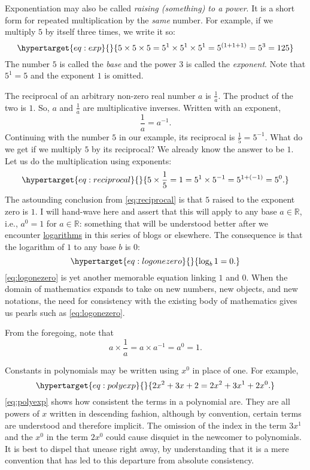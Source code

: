 \documentclass[
  a4paper,
]{article}
\begin{document}
Exponentiation may also be called \emph{raising (something) to a power}.
It is a short form for repeated multiplication by the \emph{same}
number. For example, if we multiply \(5\) by itself three times, we
write it so: \begin{equation}\protect\hypertarget{eq:exp}{}{
5\times5\times5 = 5^1\times5^1\times5^1 = 5^{(1+1+1)} = 5^{3} = 125
}\label{eq:exp}\end{equation} The number \(5\) is called the \emph{base}
and the power \(3\) is called the \emph{exponent}. Note that \(5^1 = 5\)
and the exponent \(1\) is omitted.

The reciprocal of an arbitrary non-zero real number \(a\) is
\(\frac{1}{a}\). The product of the two is \(1\). So, \(a\) and
\(\frac{1}{a}\) are multiplicative inverses. Written with an exponent,
\[
\frac{1}{a} = a^{-1}.
\] Continuing with the number \(5\) in our example, its reciprocal is
\(\frac{1}{5} = 5^{-1}\). What do we get if we multiply \(5\) by its
reciprocal? We already know the answer to be \(1\). Let us do the
multiplication using exponents:
\begin{equation}\protect\hypertarget{eq:reciprocal}{}{
5 \times \frac{1}{5} = 1 = 5^{1} \times 5^{-1} = 5^{1+(-1)} = 5^{0}.
}\label{eq:reciprocal}\end{equation} The astounding conclusion from
\cref{eq:reciprocal} is that \(5\) raised to the exponent zero is
\({1}\). I will hand-wave here and assert that this will apply to any
base \(a \in \mathbb{R}\), i.e., \(a^0 = 1\) for \(a \in \mathbb{R}\):
something that will be understood better after we encounter
\href{https://www.britannica.com/science/logarithm}{logarithms} in this
series of blogs or elsewhere. The consequence is that the logarithm of
\(1\) to any base \(b\) is \(0\):
\begin{equation}\protect\hypertarget{eq:logonezero}{}{
\log_{b}1 = 0.
}\label{eq:logonezero}\end{equation} \cref{eq:logonezero} is yet another
memorable equation linking \(1\) and \(0\). When the domain of
mathematics expands to take on new numbers, new objects, and new
notations, the need for consistency with the existing body of
mathematics gives us pearls such as \cref{eq:logonezero}.

From the foregoing, note that \[
a \times \frac{1}{a} = a \times a^{-1} = a^0 = 1.
\]

Constants in polynomials may be written using \(x^0\) in place of one.
For example, \begin{equation}\protect\hypertarget{eq:polyexp}{}{
2x^2 + 3x + 2 = 2x^2 + 3x^1 + 2x^0.
}\label{eq:polyexp}\end{equation} \cref{eq:polyexp} shows how consistent
the terms in a polynomial are. They are all powers of \(x\) written in
descending fashion, although by convention, certain terms are understood
and therefore implicit. The omission of the index in the term \(3x^1\)
and the \(x^0\) in the term \(2x^0\) could cause disquiet in the
newcomer to polynomials. It is best to dispel that unease right away, by
understanding that it is a mere convention that has led to this
departure from absolute consistency.
\end{document}
